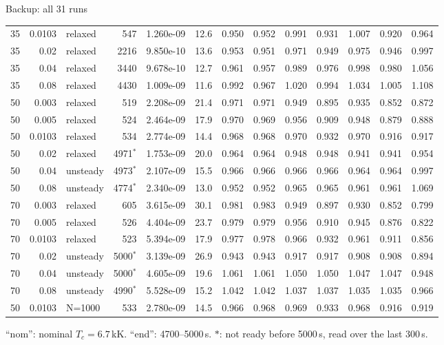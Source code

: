 \documentclass[aspectratio=169,10pt]{beamer}
\begin{document}
\begin{frame}{Backup: all 31 runs}
\begin{center}
\begin{tabular}{@{}rrlrrrrrrrrrr@{}}
35 & 0.0103 & relaxed & 547 & 1.260e-09 & 12.6 & 0.950 & 0.952 & 0.991 & 0.931 & 1.007 & 0.920 & 0.964 \\
35 & 0.02 & relaxed & 2216 & 9.850e-10 & 13.6 & 0.953 & 0.951 & 0.971 & 0.949 & 0.975 & 0.946 & 0.997 \\
35 & 0.04 & relaxed & 3440 & 9.678e-10 & 12.7 & 0.961 & 0.957 & 0.989 & 0.976 & 0.998 & 0.980 & 1.056 \\
35 & 0.08 & relaxed & 4430 & 1.009e-09 & 11.6 & 0.992 & 0.967 & 1.020 & 0.994 & 1.034 & 1.005 & 1.108 \\
50 & 0.003 & relaxed & 519 & 2.208e-09 & 21.4 & 0.971 & 0.971 & 0.949 & 0.895 & 0.935 & 0.852 & 0.872 \\
50 & 0.005 & relaxed & 524 & 2.464e-09 & 17.9 & 0.970 & 0.969 & 0.956 & 0.909 & 0.948 & 0.879 & 0.888 \\
50 & 0.0103 & relaxed & 534 & 2.774e-09 & 14.4 & 0.968 & 0.968 & 0.970 & 0.932 & 0.970 & 0.916 & 0.917 \\
50 & 0.02 & relaxed & 4971$^\ast$ & 1.753e-09 & 20.0 & 0.964 & 0.964 & 0.948 & 0.948 & 0.941 & 0.941 & 0.954 \\
50 & 0.04 & unsteady & 4973$^\ast$ & 2.107e-09 & 15.5 & 0.966 & 0.966 & 0.966 & 0.966 & 0.964 & 0.964 & 0.997 \\
50 & 0.08 & unsteady & 4774$^\ast$ & 2.340e-09 & 13.0 & 0.952 & 0.952 & 0.965 & 0.965 & 0.961 & 0.961 & 1.069 \\
70 & 0.003 & relaxed & 605 & 3.615e-09 & 30.1 & 0.981 & 0.983 & 0.949 & 0.897 & 0.930 & 0.852 & 0.799 \\
70 & 0.005 & relaxed & 526 & 4.404e-09 & 23.7 & 0.979 & 0.979 & 0.956 & 0.910 & 0.945 & 0.876 & 0.822 \\
70 & 0.0103 & relaxed & 523 & 5.394e-09 & 17.9 & 0.977 & 0.978 & 0.966 & 0.932 & 0.961 & 0.911 & 0.856 \\
70 & 0.02 & unsteady & 5000$^\ast$ & 3.139e-09 & 26.9 & 0.943 & 0.943 & 0.917 & 0.917 & 0.908 & 0.908 & 0.894 \\
70 & 0.04 & unsteady & 5000$^\ast$ & 4.605e-09 & 19.6 & 1.061 & 1.061 & 1.050 & 1.050 & 1.047 & 1.047 & 0.948 \\
70 & 0.08 & unsteady & 4990$^\ast$ & 5.528e-09 & 15.2 & 1.042 & 1.042 & 1.037 & 1.037 & 1.035 & 1.035 & 0.966 \\
\midrule
50 & 0.0103 & N=1000 & 533 & 2.780e-09 & 14.5 & 0.966 & 0.968 & 0.969 & 0.933 & 0.968 & 0.916 & 0.919 \\
    \bottomrule
  \end{tabular}
  \end{center}
  ``nom'': nominal $T_c = 6.7$\,kK. ``end'': 4700--5000\,s. $\ast$: not ready
  before 5000\,s, read over the last 300\,s.
\end{frame}
\end{document}
